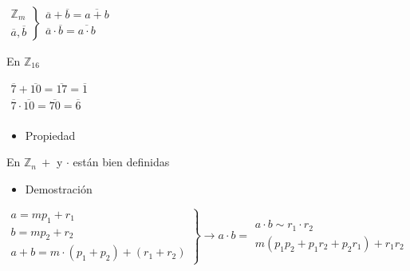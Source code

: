 \documentclass[12pt]{article}
\begin{document}
$\left.\begin{array}{l}
	\mathbb{Z}_m\\
	\overline{a}, \overline{b}
\end{array}\right\}\begin{array}{l}
\overline{a} +\overline{b}=\overline{a+b}\\
\overline{a} \cdot\overline{b}=\overline{a\cdot b}\\
\end{array}$

En $\mathbb{Z}_{16}$

$\begin{array}{l}
	\overline{7}+\overline{10}=\overline{17}=\overline{1}\\
	\overline{7}\cdot\overline{10}=\overline{70}=\overline{6}\\
\end{array}$

\begin{itemize}[label=\color{red}\textbullet, leftmargin=*]
	\item \color{lightblue}Propiedad
\end{itemize}
En $\mathbb{Z}_n~+$ y $\cdot$ están bien definidas 
\begin{itemize}[label=\color{red}\textbullet, leftmargin=*]
	\item \color{lightblue}Demostración
\end{itemize}
$\left.\begin{array}{l}
	a=mp_1+r_1\\
	b=mp_2+r_2\\ \hline
	a+b=m\cdot(p_1+p_2)+(r_1+r_2)
\end{array}\right\}\longrightarrow a\cdot b=\begin{array}{l}
a\cdot b\sim r_1\cdot r_2\\
m(p_1p_2+p_1r_2+p_2r_1)+r_1r_2
\end{array}$
\end{document}
